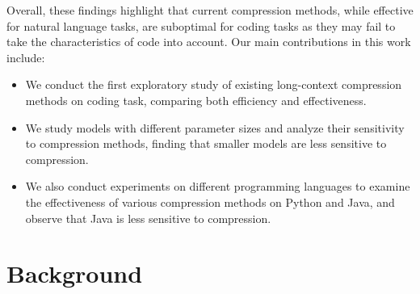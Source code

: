 
Overall, these findings highlight that current compression methods, while effective for natural language tasks, are suboptimal for coding tasks as they may fail to take the characteristics of code into account. 
Our main contributions in this work include:
\begin{itemize} %
    \item We conduct the first exploratory study of existing long-context compression methods on coding task, comparing both efficiency and effectiveness. %
    \item We study models with different parameter sizes and analyze their sensitivity to compression methods, finding that smaller models are less sensitive to compression.  
    \item We also conduct experiments on different programming languages to examine the effectiveness of various compression methods on Python and Java, and observe that Java is less sensitive to compression.
\end{itemize}






\section{Background}
\vspace{-2pt}
\label{background}


